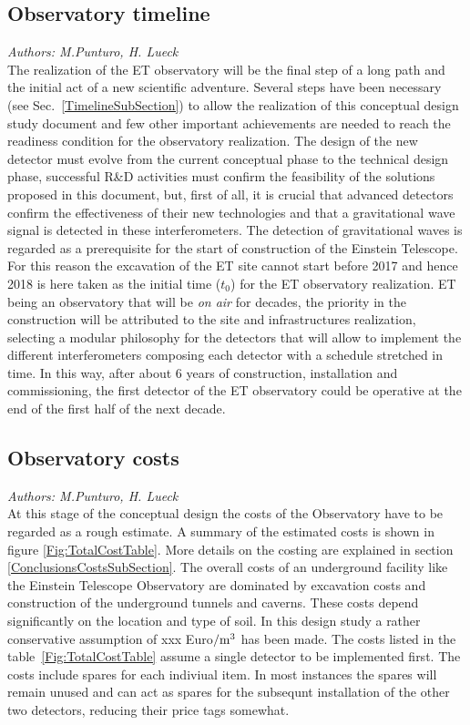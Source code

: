 \subsection{Observatory timeline}
\emph{Authors: M.Punturo, H. Lueck} \\
The realization of the ET observatory will be the final step of a long path and the initial act of a new scientific adventure. Several steps have been necessary (see Sec.~\ref{TimelineSubSection}) to allow the realization of this conceptual design study document  and few other important achievements are needed to reach the readiness condition for the observatory realization. The design of the new detector must evolve from the current conceptual phase to the technical design phase, successful R\&D activities must confirm the feasibility of the solutions proposed in this document, but, first of all, it is crucial that advanced detectors confirm the effectiveness of their new technologies and that a gravitational wave signal is detected in these interferometers. The detection of gravitational waves is regarded as a prerequisite for the start of construction of the Einstein Telescope.
For this reason the excavation of the ET site cannot start before 2017 and hence 2018 is here taken as the initial time ($t_0$) for the ET observatory realization. ET being an observatory that will be \emph{on air} for decades, the priority in the construction will be attributed to the site and infrastructures realization, selecting a modular philosophy for the detectors that will allow to implement the different interferometers composing each detector with a schedule stretched in time. In this way, after about 6 years of construction, installation and commissioning, the first detector of the ET observatory could be operative at the end of the first half of the next decade.
\FloatBarrier
\subsection{Observatory costs}
\emph{Authors: M.Punturo, H. Lueck} \\
At this stage of the conceptual design the costs of the Observatory have to be regarded as a rough estimate. A summary of the estimated costs is shown in figure \ref{Fig:TotalCostTable}. More details on the costing are explained in section \ref{ConclusionsCostsSubSection}.
The overall costs of an underground facility like the Einstein Telescope Observatory are dominated by excavation costs and construction of the underground tunnels and caverns. These costs depend significantly on the location and type of soil. In this design study a rather conservative assumption of xxx Euro$\rm{/m^3}$  has been made. The costs listed in the table~\ref{Fig:TotalCostTable} assume a single detector to be implemented first. The costs include spares for each indiviual item. In most instances the spares will remain unused and can act as spares for the subsequnt installation of the other two detectors, reducing their price tags somewhat.
